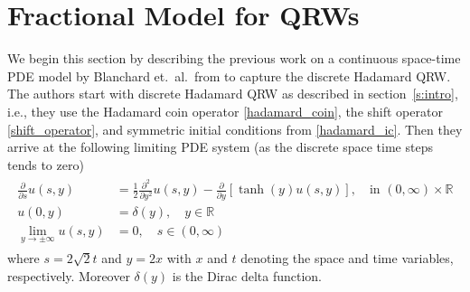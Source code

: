 \documentclass{siamart1116}
\begin{document}
\section{Fractional Model for QRWs} \label{The Fractional Model} 


We begin this section by describing the previous work on a continuous space-time PDE 
model by Blanchard et.\ al.\ from \cite{blanchard} to capture the discrete Hadamard QRW. 
The authors start with discrete Hadamard QRW as described in section~\ref{s:intro}, i.e., 
they use the Hadamard coin operator \eqref{hadamard_coin}, the shift operator 
\eqref{shift_operator}, and  symmetric initial conditions from \eqref{hadamard_ic}. Then 
they arrive at the following limiting PDE system (as the discrete space time steps tends to zero)  %
%
\begin{align}\label{classical}
\begin{aligned}
\frac{\partial}{\partial s}u(s,y)&=\frac{1}{2}\frac{\partial^2}{\partial y^2}u(s,y)-\frac{\partial}{\partial y}[\tanh(y)u(s,y)], \quad \text{in } (0,\infty)\times\mathbb{R} \\
u(0,y)&=\delta(y), \quad y \in \mathbb{R} \\
\lim_{y\to\pm\infty} u(s,y)&=0 ,\quad s \in (0,\infty)  
\end{aligned}
\end{align}
%
where $s=2\sqrt{2}t$ and $y=2x$ with $x$ and $t$ denoting the space and time variables, 
respectively. Moreover $\delta(y)$ is the Dirac delta function. 
\end{document}
